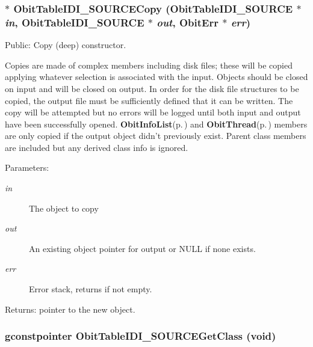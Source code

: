 \subsubsection{$\ast$ Obit\-Table\-IDI\_\-SOURCECopy ({\bf Obit\-Table\-IDI\_\-SOURCE} $\ast$ {\em in}, {\bf Obit\-Table\-IDI\_\-SOURCE} $\ast$ {\em out}, {\bf Obit\-Err} $\ast$ {\em err})}\label{ObitTableIDI__SOURCE_8h_a14}


Public: Copy (deep) constructor. 

Copies are made of complex members including disk files; these will be copied applying whatever selection is associated with the input. Objects should be closed on input and will be closed on output. In order for the disk file structures to be copied, the output file must be sufficiently defined that it can be written. The copy will be attempted but no errors will be logged until both input and output have been successfully opened. {\bf Obit\-Info\-List}{\rm (p.\,\pageref{structObitInfoList})} and {\bf Obit\-Thread}{\rm (p.\,\pageref{structObitThread})} members are only copied if the output object didn't previously exist. Parent class members are included but any derived class info is ignored. \begin{Desc}
\item[Parameters:]
\begin{description}
\item[{\em in}]The object to copy \item[{\em out}]An existing object pointer for output or NULL if none exists. \item[{\em err}]Error stack, returns if not empty. \end{description}
\end{Desc}
\begin{Desc}
\item[Returns:]pointer to the new object. \end{Desc}
\subsubsection{\setlength{\rightskip}{0pt plus 5cm}gconstpointer Obit\-Table\-IDI\_\-SOURCEGet\-Class (void)}\label{ObitTableIDI__SOURCE_8h_a13}


